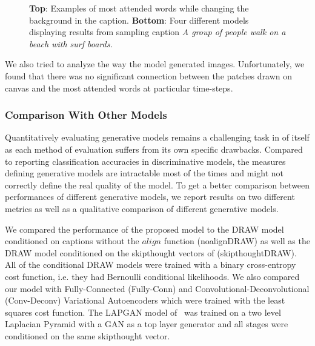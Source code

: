 \documentclass{article} %
\begin{document}
\begin{figure}[!t]
\begin{center}
%
\quad
%
\quad
%
\end{center}
\caption{ \textbf{Top}: Examples of most attended words while changing the background in the caption. 
\textbf{Bottom}: Four different models displaying results from sampling caption \textit{A group of people walk on a beach with surf boards.}}
\label{fig:diffmodels}
\vspace{-0.1in}
\end{figure}

We also tried to analyze the way the model generated images. Unfortunately, we found that there was no significant connection between the patches drawn on canvas and the most attended words at particular time-steps.

\subsubsection{Comparison With Other Models}
\vspace{-0.05in}
Quantitatively evaluating generative models remains a challenging task in of itself as each method of evaluation suffers from its own specific drawbacks. Compared to reporting classification accuracies in discriminative models, the measures defining generative models are intractable most of the times and might not correctly define the real quality of the model. To get a better comparison between performances of different generative models, we report results on two different metrics as well as a qualitative comparison of different generative models.

We compared the performance of the proposed model to the DRAW model conditioned on captions without the $align$ function (noalignDRAW) as well as the DRAW model conditioned on the skipthought vectors of \citep{kiros_skipthought} (skipthoughtDRAW). All of the conditional DRAW models were trained with a binary cross-entropy cost function, i.e. they had Bernoulli conditional likelihoods. We also compared our model with Fully-Connected (Fully-Conn) and Convolutional-Deconvolutional (Conv-Deconv) Variational Autoencoders which were trained with the least squares cost function. The LAPGAN model of~\citep{denton_lapgan} was trained on a two level Laplacian Pyramid with a GAN as a top layer generator and all stages were conditioned on the same skipthought vector.
\end{document}
